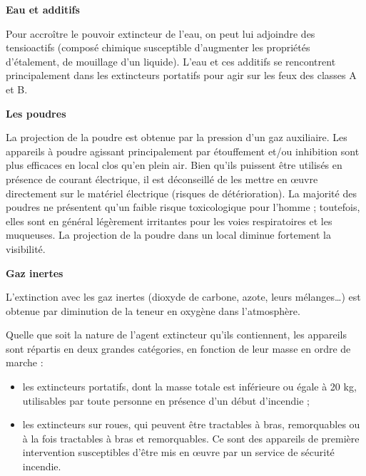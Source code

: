 \vspace{0.3cm}
\textbf{Eau et additifs}
\vspace{0.3cm}


Pour accroître le pouvoir extincteur de l’eau, on peut lui adjoindre des tensioactifs (composé chimique susceptible d’augmenter les propriétés d’étalement, de mouillage d’un liquide).
L’eau et ces additifs se rencontrent principalement dans les extincteurs portatifs pour agir sur les feux des classes A et B.


\vspace{0.3cm}
\textbf{Les poudres}
\vspace{0.3cm} 

La projection de la poudre est obtenue par la pression d’un gaz auxiliaire.
Les appareils à poudre agissant principalement par étouffement et/ou inhibition sont plus efficaces en local clos qu’en plein air. Bien qu’ils puissent être utilisés en présence de courant électrique, il est déconseillé de les mettre en œuvre directement sur le matériel électrique (risques de détérioration).
La majorité des poudres ne présentent qu’un faible risque toxicologique pour l’homme ; toutefois, elles sont en général légèrement irritantes pour les voies respiratoires et les muqueuses. La projection de la poudre dans un local diminue fortement la visibilité.


\vspace{0.3cm}
\textbf{Gaz inertes}
\vspace{0.3cm} 

L’extinction avec les gaz inertes (dioxyde de carbone, azote, leurs mélanges…) est obtenue par diminution de la teneur en oxygène dans l’atmosphère.

Quelle que soit la nature de l’agent extincteur qu’ils contiennent, les appareils sont répartis en deux grandes catégories, en fonction de leur masse en ordre de marche :


\begin{itemize}
\item  les extincteurs portatifs, dont la masse totale est inférieure ou égale à 20 kg, utilisables par toute personne en présence d’un début d’incendie ;
\item  les extincteurs sur roues, qui peuvent être tractables à bras, remorquables ou à la fois tractables à bras et remorquables. Ce sont des appareils de première intervention susceptibles d’être mis en œuvre par un service de sécurité incendie.

 \end{itemize}
 

